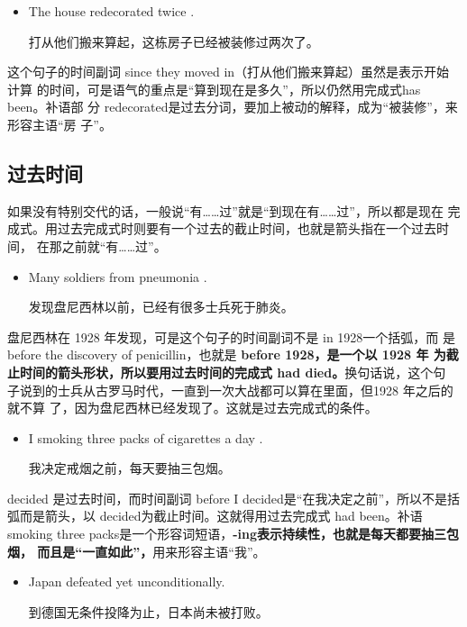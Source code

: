 \begin{itemize}
\item  The house  redecorated twice .

  打从他们搬来算起，这栋房子已经被装修过两次了。
\end{itemize}

这个句子的时间副词 since they moved in（打从他们搬来算起）虽然是表示开始计算
的时间，可是语气的重点是“算到现在是多久”，所以仍然用完成式has been。补语部
分 redecorated是过去分词，要加上被动的解释，成为“被装修”，来形容主语“房
子”。

\subsection{过去时间}

如果没有特别交代的话，一般说“有……过”就是“到现在有……过”，所以都是现在
完成式。用过去完成式时则要有一个过去的截止时间，也就是箭头指在一个过去时间，
在那之前就“有……过”。

\begin{itemize}
\item  Many soldiers  from pneumonia .

  发现盘尼西林以前，已经有很多士兵死于肺炎。
\end{itemize}

盘尼西林在 1928 年发现，可是这个句子的时间副词不是 in 1928一个括弧，而
是 before the discovery of penicillin，也就是 \textbf{before 1928，是一个以 1928 年
  为截止时间的箭头形状，所以要用过去时间的完成式 had died。}换句话说，这个句
子说到的士兵从古罗马时代，一直到一次大战都可以算在里面，但1928 年之后的就不算
了，因为盘尼西林已经发现了。这就是过去完成式的条件。

\begin{itemize}
\item  I  smoking three packs of cigarettes a day .

  我决定戒烟之前，每天要抽三包烟。
\end{itemize}

decided 是过去时间，而时间副词 before I decided是“在我决定之前”，所以不是括
弧而是箭头，以 decided为截止时间。这就得用过去完成式 had been。补语 smoking
three packs是一个形容词短语，\textbf{-ing表示持续性，也就是每天都要抽三包烟，
  而且是“一直如此”，}用来形容主语“我”。


\begin{itemize}
\item  Japan  defeated yet  unconditionally.

  到德国无条件投降为止，日本尚未被打败。
\end{itemize}

